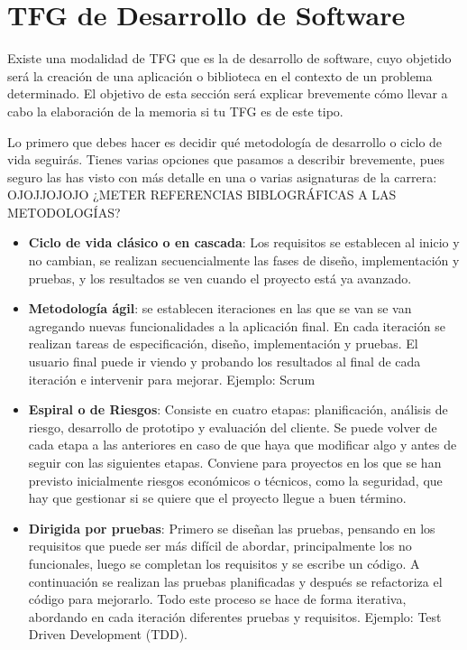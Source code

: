 \section{TFG de Desarrollo de Software}
\label{appendix:desarrollo}

Existe una modalidad de TFG que es la de desarrollo de software, cuyo objetido será la creación de una aplicación o biblioteca en el contexto de un problema determinado. El objetivo de esta sección será explicar brevemente cómo llevar a cabo la elaboración de la memoria si tu TFG es de este tipo.

Lo primero que debes hacer es decidir qué metodología de desarrollo o ciclo de vida seguirás. Tienes varias opciones que pasamos a describir brevemente, pues seguro las has visto con más detalle en una o varias asignaturas de la carrera: OJOJJOJOJO ¿METER REFERENCIAS BIBLOGRÁFICAS A LAS METODOLOGÍAS?
\begin{itemize}
    \item \textbf{Ciclo de vida clásico o en cascada}: Los requisitos se establecen al inicio y no cambian, se realizan secuencialmente las fases de diseño, implementación y pruebas, y los resultados se ven cuando el proyecto está ya avanzado. 
     \item \textbf{Metodología ágil}: se establecen iteraciones en las que se van se van agregando nuevas funcionalidades a la aplicación final. En cada iteración se realizan tareas de especificación, diseño, implementación y pruebas. El usuario final puede ir viendo y probando los resultados al final de cada iteración e intervenir para mejorar. Ejemplo: Scrum
     \item \textbf{Espiral o de Riesgos}: Consiste en cuatro etapas: planificación, análisis de riesgo, desarrollo de prototipo y evaluación del cliente. Se puede volver de cada etapa a las anteriores en caso de que haya que modificar algo y antes de seguir con las siguientes etapas. Conviene para proyectos en los que se han previsto inicialmente riesgos económicos o técnicos, como la seguridad, que hay que gestionar si se quiere que el proyecto llegue a buen término.
     \item \textbf{Dirigida por pruebas}: Primero se diseñan las pruebas, pensando en los requisitos que puede ser más difícil de abordar, principalmente los no funcionales, luego se completan los requisitos y se escribe un código. A continuación se realizan las pruebas planificadas y después se refactoriza el código para mejorarlo. Todo este proceso se hace de forma iterativa, abordando en cada iteración diferentes pruebas y requisitos. Ejemplo: Test Driven Development (TDD).

\end{itemize}

